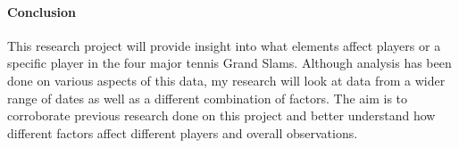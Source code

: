 \documentclass[12pt]{article}
\begin{document}
\paragraph{Conclusion}
This research project will provide insight into what elements affect players or a specific player in the four major tennis Grand Slams. Although analysis has been done on various aspects of this data, my research will look at data from a wider range of dates as well as a different combination of factors. The aim is to corroborate previous research done on this project and better understand how different factors affect different players and overall observations. 



\end{document}
